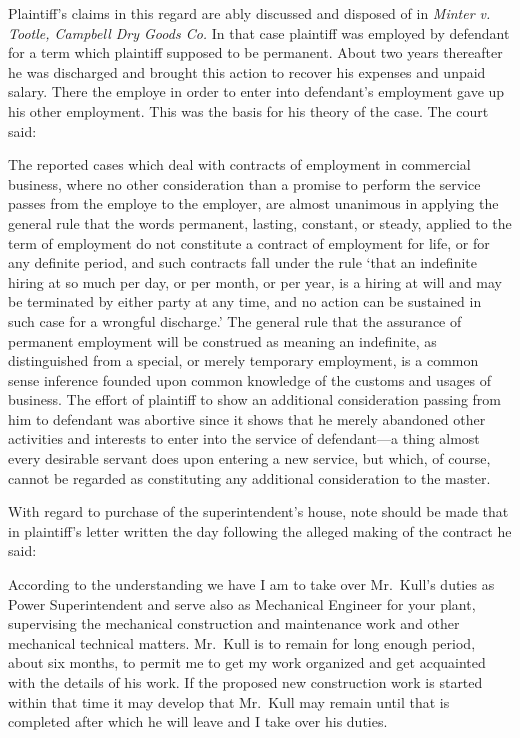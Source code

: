 \documentclass[
  letterpaper,
  11pt,
  DIV=9,
  openright]{scrbook}
\renewenvironment{quote}{
  \list{}{\leftmargin=2em\rightmargin=2em}
  \item\relax\small
}
{\endlist}
\begin{document}
Plaintiff's claims in this regard are ably discussed and disposed of in
\emph{Minter v. Tootle, Campbell Dry Goods Co.} In that case plaintiff
was employed by defendant for a term which plaintiff supposed to be
permanent. About two years thereafter he was discharged and brought this
action to recover his expenses and unpaid salary. There the employe in
order to enter into defendant's employment gave up his other employment.
This was the basis for his theory of the case. The court said:

\begin{quote}
The reported cases which deal with contracts of employment in commercial
business, where no other consideration than a promise to perform the
service passes from the employe to the employer, are almost unanimous in
applying the general rule that the words permanent, lasting, constant,
or steady, applied to the term of employment do not constitute a
contract of employment for life, or for any definite period, and such
contracts fall under the rule `that an indefinite hiring at so much per
day, or per month, or per year, is a hiring at will and may be
terminated by either party at any time, and no action can be sustained
in such case for a wrongful discharge.' The general rule that the
assurance of permanent employment will be construed as meaning an
indefinite, as distinguished from a special, or merely temporary
employment, is a common sense inference founded upon common knowledge of
the customs and usages of business. The effort of plaintiff to show an
additional consideration passing from him to defendant was abortive
since it shows that he merely abandoned other activities and interests
to enter into the service of defendant---a thing almost every desirable
servant does upon entering a new service, but which, of course, cannot
be regarded as constituting any additional consideration to the master.
\end{quote}

With regard to purchase of the superintendent's house, note should be
made that in plaintiff's letter written the day following the alleged
making of the contract he said:

\begin{quote}
According to the understanding we have I am to take over Mr.~Kull's
duties as Power Superintendent and serve also as Mechanical Engineer for
your plant, supervising the mechanical construction and maintenance work
and other mechanical technical matters. Mr.~Kull is to remain for long
enough period, about six months, to permit me to get my work organized
and get acquainted with the details of his work. If the proposed new
construction work is started within that time it may develop that
Mr.~Kull may remain until that is completed after which he will leave
and I take over his duties.
\end{quote}
\end{document}
